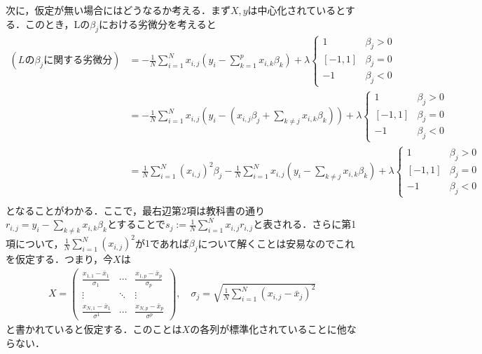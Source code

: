 \documentclass{jsarticle}
\theoremstyle{definition}
\theoremstyle{mystyle} %
\begin{document}
次に，仮定が無い場合にはどうなるか考える．まず$X,y$は中心化されているとする．このとき，Lの$\beta_j$における劣微分を考えると
\begin{equation}
\begin{split}
\label{nagai}
(Lの\beta_jに関する劣微分) &=-\frac{1}{N}\sum_{i=1}^N x_{i,j}\left(y_i-\sum_{k=1}^p x_{i,k}\beta_k\right)+ \lambda\begin{cases}
1 & \beta_j>0\\
[-1,1] & \beta_j = 0\\
-1 & \beta_j< 0
\end{cases}\\
&=-\frac{1}{N}\sum_{i=1}^Nx_{i,j}\left(y_i-\left(x_{i,j} \beta_j+\sum_{k\neq j}x_{i,k}\beta_k\right)\right)+\lambda\begin{cases}
1 & \beta_j>0\\
[-1,1] & \beta_j = 0\\
-1 & \beta_j< 0
\end{cases}\\
&=\frac{1}{N}\sum_{i=1}^N(x_{i,j})^2\beta_j-\frac{1}{N}\sum_{i=1}^Nx_{i,j}\left(y_i-\sum_{k\neq j}x_{i,k}\beta_k\right)+\lambda\begin{cases}
1 & \beta_j>0\\
[-1,1] & \beta_j = 0\\
-1 & \beta_j< 0
\end{cases}\\
\end{split}
\end{equation}
となることがわかる．ここで，最右辺第2項は教科書の通り$\displaystyle r_{i,j} = y_i-\sum_{k\neq k}x_{i,k}\beta_k$とすることで$s_j := \frac{1}{N}\sum_{i=1}^Nx_{i,j}r_{i,j}$と表される．さらに第1項について，$\displaystyle\frac{1}{N}\sum_{i=1}^N(x_{i,j})^2$が$1$であれば$\beta_j$について解くことは安易なのでこれを仮定する．つまり，今$X$は
\begin{align*}
X = \displaystyle\begin{pmatrix}
\displaystyle\frac{x_{1,1}-\bar{x}_1}{\sigma_1} & \cdots & \displaystyle\frac{x_{1,p}-\bar{x}_p}{\sigma_p}\\
\vdots & \ddots & \vdots\\
\displaystyle\frac{x_{N,1}-\bar{x}_1}{\sigma^1}& \cdots &\displaystyle \frac{x_{N,p}-\bar{x}_p}{\sigma^p}
\end{pmatrix},\quad \sigma_j = \sqrt{\frac{1}{N}\sum_{i=1}^N(x_{i,j}-\bar{x}_j)^2}
\end{align*}
と書かれていると仮定する．このことは$X$の各列が標準化されていることに他ならない．\\
\end{document}

